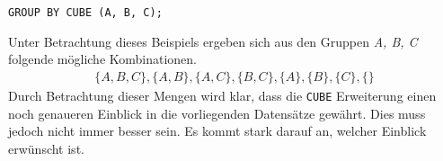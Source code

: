 \texttt{GROUP BY CUBE (A, B, C);}

Unter Betrachtung dieses Beispiels ergeben sich aus den Gruppen \textit{A, B, C}
folgende mögliche Kombinationen.
\begin{align*}
	\{ A, B, C\}, \{A, B\}, \{A, C\}, \{B, C\}, \{A\}, \{B\}, \{C\}, \{ \}
\end{align*}
Durch Betrachtung dieser Mengen wird klar, dass die \texttt{CUBE} Erweiterung einen
noch genaueren Einblick in die vorliegenden Datensätze gewährt. Dies muss jedoch
nicht immer besser sein. Es kommt stark darauf an, welcher Einblick erwünscht
ist.

